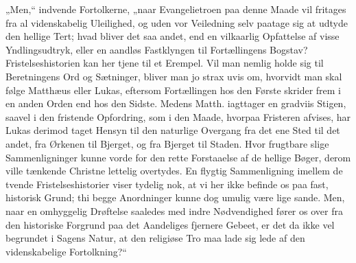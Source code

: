 \documentclass[12pt,a4paper]{book}
\begin{document}
„Men,“ indvende Fortolkerne, „naar Evangelietroen paa denne Maade vil fritages fra al
videnskabelig Uleilighed, og uden vor Veiledning selv paatage sig at udtyde den hellige
Tert; hvad bliver det saa andet, end en vilkaarlig Opfattelse af visse Yndlingsudtryk,
eller en aandløs Fastklyngen til Fortællingens Bogstav? Fristelseshistorien kan her tjene
til et Erempel. Vil man nemlig holde sig til Beretningens Ord og Sætninger, bliver man
jo strax uvis om, hvorvidt man skal følge Matthæus eller Lukas, eftersom Fortællingen
hos den Første skrider frem i en anden Orden end hos den Sidste. Medens Matth. iagttager
en gradviis Stigen, saavel i den fristende Opfordring, som i den Maade, hvorpaa Fristeren
afvises, har Lukas derimod taget Hensyn til den naturlige Overgang fra det ene Sted til
det andet, fra Ørkenen til
Bjerget, og fra Bjerget til Staden. Hvor frugtbare slige Sammenligninger kunne vorde for
den rette Forstaaelse af de hellige Bøger, derom ville tænkende Christne lettelig
overtydes. En flygtig Sammenligning imellem de tvende Fristelseshistorier viser tydelig
nok, at vi her ikke befinde os paa fast, historisk Grund; thi begge Anordninger kunne
dog umulig være lige sande. Men, naar en omhyggelig Drøftelse saaledes med indre
Nødvendighed fører os over fra den historiske Forgrund paa det Aandeliges fjernere
Gebeet, er det da ikke vel begrundet i Sagens Natur, at den religiøse Tro maa lade sig
lede af den videnskabelige Fortolkning?“
\end{document}
